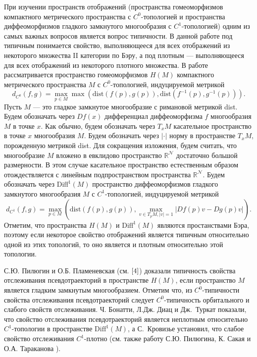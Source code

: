\documentclass[12pt]{article}
\begin{document}
При изучении пространств отображений (пространства гомеоморфизмов компактного метрического пространства с $C^0$-топологией и пространства диффеоморфизмов гладкого замкнутого многообразия с $C^1$-топологией) одним из самых важных вопросов является вопрос типичности. В данной работе под типичным понимается свойство, выполняющееся для всех отображений из некоторого множества II категории по Бэру, а под плотным --- выполняющееся для всех отображений из некоторого плотного множества. В работе рассматривается пространство гомеоморфизмов $H(M)$ компактного метрического пространства $M$ с $C^0$-топологией, индуцируемой метрикой
$$d_{C^0}(f,g)=\max_{p\in M}\max\left(\mbox{dist}(f(p),g(p)),\mbox{dist}(f^{-1}(p),g^{-1}(p))\right).$$
Пусть $M$ --- это гладкое замкнутое многообразие с римановой метрикой dist. Будем обозначать через $Df(x)$ дифференциал диффеоморфизма $f$ многообразия $M$ в точке $x$. Как обычно, будем обозначать через $T_xM$ касательное пространство в точке $x$ многообразия $M$. Будем обозначать через $|\cdot|$ норму в пространстве $T_xM$, порожденную метрикой dist.
Для сокращения изложения, будем считать, что многообразие $M$ вложено в евклидово пространство $\mathbb{R}^{\mathcal{N}}$ достаточно большой размерности. В этом случае касательное пространство естественным образом отождествляется с линейным подпространством пространства $\mathbb{R}^{\mathcal{N}}$.
Будем обозначать через $\mbox{Diff}^1(M)$ пространство диффеоморфизмов гладкого замкнутого многообразия $M$ с $C^1$-топологией, индуцируемой метрикой
$$d_{C^1}(f,g)=\max_{p\in M}\left(\mbox{dist}(f(p),g(p)),\max_{v\in T_pM, |v|=1}|Df(p)v-Dg(p)v|\right).$$
 Отметим, что пространства $H(M)$ и $\mbox{Diff}^1(M)$ являются простанствами Бэра, поэтому если некоторое свойство отображений является типичным относительно одной из этих топологий, то оно является и плотным относительно этой топологии.

С.Ю. Пилюгин и О.Б. Пламеневская (см. $\cite{4}$) доказали типичность свойства отслеживания псевдотраекторий в пространстве $H(M)$, если пространство $M$ является гладким замкнутым многообразием. Отметим что, из $C^0$-типичности свойства отслеживания псевдотраекторий следует $C^0$-типичность орбитального и слабого свойств отслеживания. Ч. Бонатти, Л.Дж. Диац и Дж.~Туркат \cite{5} показали, что свойство отслеживания псевдотраекторий является неплотным относительно $C^1$-топологии в пространстве $\mbox{Diff}^1(M)$, а С.~Кровизье \cite{6} установил, что слабое свойство отслеживания $C^1$-плотно (см. также работу С.Ю. Пилюгина, К. Сакая и О.А. Тараканова \cite{PT}). 
\end{document}
